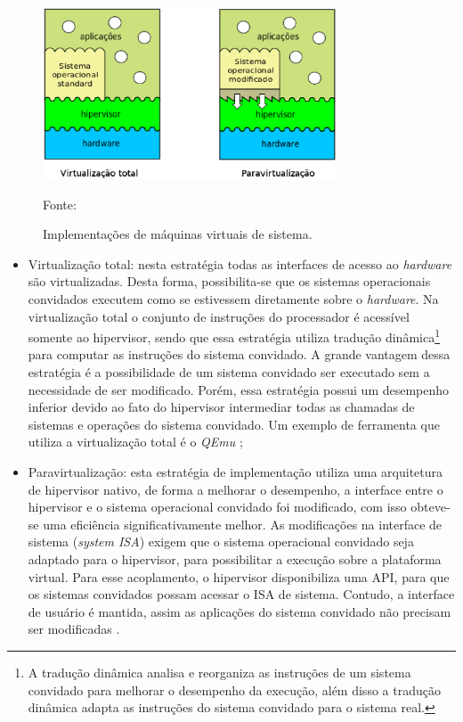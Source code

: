 \begin{figure}[h!]
 \centering
 \includegraphics[width=330px]{img/vms_implementacao.eps}
 \caption{Implementações de máquinas virtuais de sistema.}
 \label{fig:vms_implementacao}
 Fonte: \citet{maziero2013}
\end{figure}

\begin{itemize}
 \item Virtualização total: nesta estratégia todas as interfaces de acesso ao \textit{hardware} são virtualizadas. Desta forma, possibilita-se 
 que os sistemas operacionais convidados executem como se estivessem diretamente sobre o \textit{hardware}. Na virtualização total o conjunto de 
 instruções do processador é acessível somente ao hipervisor, sendo que essa estratégia utiliza tradução dinâmica\footnote[1]{A tradução dinâmica 
 analisa e reorganiza as instruções de um sistema convidado para melhorar o desempenho da execução, além disso a tradução dinâmica adapta as 
 instruções do sistema convidado para o sistema real.} para computar as instruções do sistema convidado. A grande vantagem dessa estratégia é a 
 possibilidade de um sistema convidado ser executado sem a necessidade de ser modificado. Porém, essa estratégia possui um desempenho inferior 
 devido ao fato do hipervisor intermediar todas as chamadas de sistemas e operações do sistema convidado. Um exemplo de ferramenta que utiliza 
 a virtualização total é o \textit{QEmu} \cite{qemu};
 \item Paravirtualização: esta estratégia de implementação utiliza uma arquitetura de hipervisor nativo, de forma a melhorar o desempenho, 
 a interface entre o hipervisor e o sistema operacional convidado foi modificado, com isso obteve-se uma eficiência significativamente melhor. 
 As modificações na interface de sistema (\textit{system \ac{ISA}}) exigem que o sistema operacional convidado seja adaptado para o hipervisor, 
 para possibilitar a execução sobre a plataforma virtual. Para esse acoplamento, o hipervisor disponibiliza uma \ac{API}, para que os 
 sistemas convidados possam acessar o \ac{ISA} de sistema. Contudo, a interface de usuário é mantida, assim as aplicações do sistema convidado 
 não precisam ser modificadas \cite{maziero2013}.
\end{itemize}

